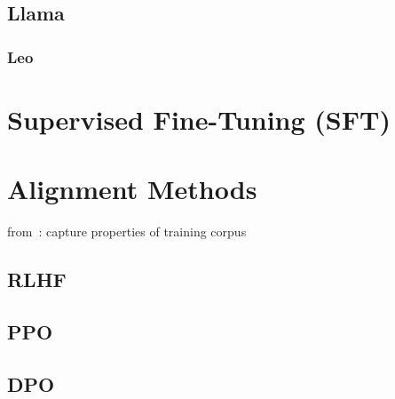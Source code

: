 \subsection{Llama}\label{subsec:llama}

\subsubsection{Leo}


\section{Supervised Fine-Tuning (SFT)}\label{sec:supervised-fine-tuning}


\section{Alignment Methods}\label{sec:alignment-methods}
from~\autocite{zhao2023survey}:
capture properties of training corpus

\subsection{RLHF}\label{subsec:rlhf}

\subsection{PPO}\label{subsec:ppo}

\subsection{DPO}\label{subsec:dpo}
